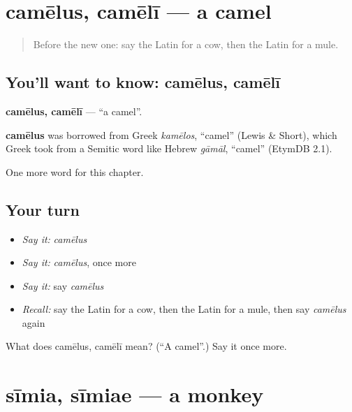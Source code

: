 \section[camēlus, camēlī]{camēlus, camēlī — a camel}

\label{lesson:LA-C134-camelus}



\begin{quote}
Before the new one: say the Latin for a cow, then the Latin for a mule.
\end{quote}

\subsection*{You'll want to know: camēlus, camēlī}
\textbf{camēlus, camēlī} — \textquotedblleft{}a camel\textquotedblright{}.

\begin{cousinweb}
\textbf{camēlus} was borrowed from Greek \emph{kamēlos}, \textquotedblleft{}camel\textquotedblright{} (Lewis \& Short), which Greek took from a Semitic word like Hebrew \emph{gāmāl}, \textquotedblleft{}camel\textquotedblright{} (EtymDB 2.1).
\end{cousinweb}

\begin{grammarlens}[title={What you've built}]
One more word for this chapter.
\end{grammarlens}

\subsection*{Your turn}
\begin{itemize}
\raggedright
  \item \emph{Say it:} \emph{camēlus}
  \item \emph{Say it:} \emph{camēlus}, once more
  \item \emph{Say it:} say \emph{camēlus}
  \item \emph{Recall:} say the Latin for a cow, then the Latin for a mule, then say \emph{camēlus} again
\end{itemize}

\begin{tcolorbox}[breakable,colback=teal!4,colframe=teal!35!black,title={Before you move on}]
What does camēlus, camēlī mean? (\textquotedblleft{}A camel\textquotedblright{}.) Say it once more.
\end{tcolorbox}
\section[sīmia, sīmiae]{sīmia, sīmiae — a monkey}


